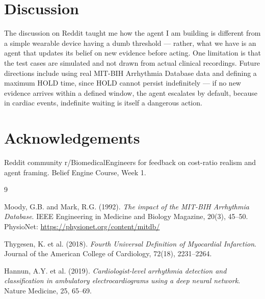 \documentclass[letterpaper]{article}
\begin{document}
\section{Discussion}
The discussion on Reddit taught me how the agent I am building is
different from a simple wearable device having a dumb threshold ---
rather, what we have is an agent that updates its belief on new
evidence before acting. One limitation is that the test cases are
simulated and not drawn from actual clinical recordings. Future
directions include using real MIT-BIH Arrhythmia Database data and
defining a maximum HOLD time, since HOLD cannot persist indefinitely
--- if no new evidence arrives within a defined window, the agent
escalates by default, because in cardiac events, indefinite waiting
is itself a dangerous action.

\section*{Acknowledgements}
Reddit community r/BiomedicalEngineers for feedback on cost-ratio
realism and agent framing. Belief Engine Course, Week 1.

\begin{thebibliography}{9}

Moody, G.B. and Mark, R.G. (1992).
\textit{The impact of the MIT-BIH Arrhythmia Database}.
IEEE Engineering in Medicine and Biology Magazine, 20(3), 45--50.
PhysioNet: \url{https://physionet.org/content/mitdb/}

Thygesen, K. et al. (2018).
\textit{Fourth Universal Definition of Myocardial Infarction}.
Journal of the American College of Cardiology, 72(18), 2231--2264.

Hannun, A.Y. et al. (2019).
\textit{Cardiologist-level arrhythmia detection and classification
in ambulatory electrocardiograms using a deep neural network}.
Nature Medicine, 25, 65--69.

\end{thebibliography}
\end{document}
